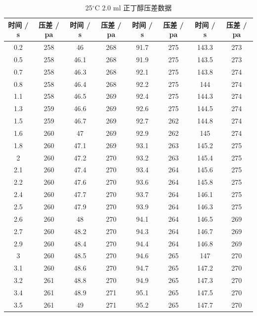 \documentclass[12pt]{ctexart}
\numberwithin{equation}{section}
\begin{document}
\begin{longtable}{cc|cc|cc|cc}
    \caption{25$^\circ$C  2.0 ml 正丁醇压差数据} \\
    \hline
    时间 / s & 压差 / pa & 时间 / s & 压差 / pa & 时间 / s & 压差 / pa & 时间 / s & 压差 / pa \\
    \hline
    0.2  &  258  &  46  &  268  &  91.7  &  275  &  143.3  &  273  \\
0.5  &  258  &  46.1  &  268  &  91.9  &  275  &  143.5  &  273  \\
0.7  &  258  &  46.3  &  268  &  92.1  &  275  &  143.8  &  274  \\
0.8  &  258  &  46.4  &  268  &  92.2  &  275  &  144  &  274  \\
1.1  &  258  &  46.5  &  269  &  92.4  &  275  &  144.3  &  274  \\
1.3  &  259  &  46.6  &  269  &  92.6  &  275  &  144.5  &  274  \\
1.5  &  259  &  46.7  &  269  &  92.7  &  262  &  144.8  &  274  \\
1.6  &  260  &  47  &  269  &  92.9  &  262  &  145  &  274  \\
1.8  &  260  &  47.1  &  269  &  93.1  &  263  &  145.2  &  275  \\
2  &  260  &  47.2  &  270  &  93.2  &  263  &  145.4  &  275  \\
2.1  &  260  &  47.4  &  270  &  93.4  &  264  &  145.6  &  275  \\
2.2  &  260  &  47.6  &  270  &  93.6  &  264  &  145.8  &  275  \\
2.4  &  260  &  47.7  &  270  &  93.7  &  264  &  146.1  &  275  \\
2.5  &  260  &  47.9  &  270  &  93.9  &  264  &  146.3  &  275  \\
2.6  &  260  &  48  &  270  &  94.1  &  264  &  146.5  &  269  \\
2.7  &  260  &  48.2  &  270  &  94.3  &  264  &  146.7  &  269  \\
2.9  &  260  &  48.4  &  270  &  94.4  &  264  &  146.8  &  269  \\
3  &  260  &  48.5  &  270  &  94.6  &  265  &  147  &  270  \\
3.1  &  260  &  48.6  &  270  &  94.7  &  265  &  147.2  &  270  \\
3.2  &  261  &  48.8  &  270  &  94.9  &  265  &  147.3  &  270  \\
3.4  &  261  &  48.9  &  271  &  95.1  &  265  &  147.5  &  270  \\
3.5  &  261  &  49  &  271  &  95.2  &  265  &  147.7  &  270  \\

\end{longtable}
\end{document}
